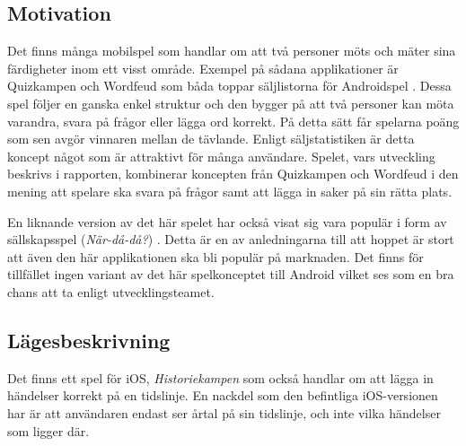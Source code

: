 \documentclass[a4paper, 11pt]{article}
\begin{document}
\subsection{Motivation}
Det finns många mobilspel som handlar om att två personer möts och mäter sina färdigheter inom ett visst område. Exempel på sådana applikationer är Quizkampen och Wordfeud som båda toppar säljlistorna för Androidspel \cite{appsalesrating}. Dessa spel följer en ganska enkel struktur och den bygger på att två personer kan möta varandra, svara på frågor eller lägga ord korrekt. På detta sätt får spelarna poäng som sen avgör vinnaren mellan de tävlande. Enligt säljstatistiken \cite{appsalesrating} är detta koncept något som är attraktivt för många användare. Spelet, vars utveckling beskrivs i rapporten, kombinerar koncepten från Quizkampen och Wordfeud i den mening att spelare ska svara på frågor samt att lägga in saker på sin rätta plats. 

En liknande version av det här spelet har också visat sig vara populär i form av sällskapsspel (\textit{När-då-då?}) \cite{nardada}. Detta är en av anledningarna till att hoppet är stort att även den här applikationen ska bli populär på marknaden. Det finns för tillfället ingen variant av det här spelkonceptet till Android vilket ses som en bra chans att ta enligt utvecklingsteamet.

\subsection{Lägesbeskrivning}
Det finns ett spel för iOS, \textit{Historiekampen} \cite{historiekampen} som också handlar om att lägga in händelser korrekt på en tidslinje. En nackdel som den befintliga iOS-versionen har är att användaren endast ser årtal på sin tidslinje, och inte vilka händelser som ligger där.
\end{document}
